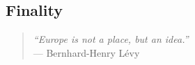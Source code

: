 \documentclass[11pt,a4paper,oneside]{article}
\begin{document}


\subsection[Finality]{Finality} %

\begin{quote}
	\emph{``Europe is not a place, but an idea.''} \\ %
	--- Bernhard-Henry L\'{e}vy
\end{quote}
\end{document}
